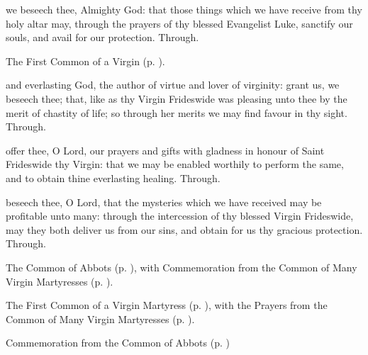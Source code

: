  we beseech thee, Almighty God: that those things which we have receive from thy holy altar may, through the prayers of thy blessed Evangelist Luke, sanctify our souls, and avail for our protection. Through.


\clearpage
{}

\begin{rubric}
	The First Common of a Virgin (p. \pageref{CommonVirginOnlyI}).
\end{rubric}

\collect
{} and everlasting God, the author of virtue and lover of virginity: grant us, we beseech thee; that, like as thy Virgin Frideswide was pleasing unto thee by the merit of chastity of life; so through her merits we may find favour in thy sight. Through.

\secret
{} offer thee, O Lord, our prayers and gifts with gladness in honour of Saint Frideswide thy Virgin: that we may be enabled worthily to perform the same, and to obtain thine everlasting healing. Through.

\postcommunion
{} beseech thee, O Lord, that the mysteries which we have received may be profitable unto many: through the intercession of thy blessed Virgin Frideswide, may they both deliver us from our sins, and obtain for us thy gracious protection. Through.



\begin{rubric}
	The Common of Abbots (p. \pageref{CommonAbbots}), with Commemoration  from the Common of Many Virgin Martyresses (p. \pageref{CommonVirginMartyrs}).
\end{rubric}



\begin{rubric}
	The First Common of a Virgin Martyress (p. \pageref{CommonVirginMartyrI}), with the Prayers from the Common of Many Virgin Martyresses (p. \pageref{CommonVirginMartyrs}).
\end{rubric}

\begin{rubric}
	Commemoration  from the Common of Abbots (p. \pageref{CommonAbbots})
\end{rubric}


